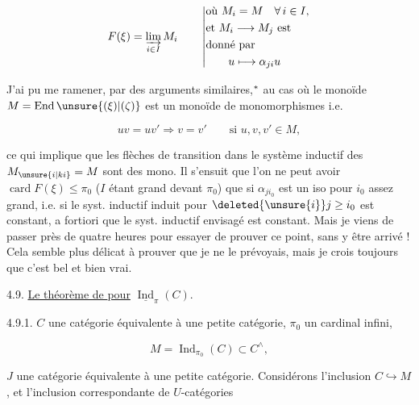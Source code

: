 \[
F(\xi)=\varinjlim_{i\in I}M_i\qquad \left|\begin{aligned}&\text{où }M_i=M\quad\forall\,i\in I,\\&\text{et }M_i\longrightarrow M_j\ \text{est}\\&\text{donné par}\\ &\qquad u\longmapsto\alpha_{ji}u\end{aligned}\right.
\]


J'ai pu me ramener, par des arguments similaires,$\vphantom{x}^{\ast}$ au cas où le monoïde $M=\operatorname{End}\unsure{(\xi)|(\zeta)}$ est un monoïde de monomorphismes i.e.

\[
uv=uv'\Longrightarrow v=v'\qquad\text{si }u,v,v'\in M,
\]

ce  qui implique que les flèches de transition dans le système inductif des $M_{\unsure{i|ki}}=M$ sont des mono. Il s'ensuit que l'on ne peut avoir $\operatorname{card}F(\xi)\leq\pi_0$ ($I$ étant grand devant $\pi_0$) que si $\alpha_{j i_0}$ est un iso pour  $i_0$ assez grand, i.e. si le syst. inductif  induit  pour $\deleted{\unsure{i}}j\geq i_0$ est constant, a fortiori que le syst. inductif envisagé est  constant. Mais je viens de passer près de quatre heures pour essayer de prouver ce point, sans y être arrivé ! Cela semble plus délicat à prouver que je ne le prévoyais, mais je crois toujours que c'est bel et bien vrai.

\margin{$\unsure{\xi|\rbrace}$}

4.9. \uline{Le théorème de } \uline{pour} $\underline{\operatorname{Ind}}_{\pi}(C)$.

4.9.1.  $C$ une catégorie équivalente à une petite catégorie, $\pi_0$ un cardinal infini,

\[
M=\operatorname{Ind}_{\pi_0}(C)\subset C^\wedge,\tag*{(4.9.1)}
\]

$J$ une catégorie équivalente à une petite catégorie. Considérons l'inclusion  $C\hookrightarrow M$, et l'inclusion correspondante de $U$-catégories

